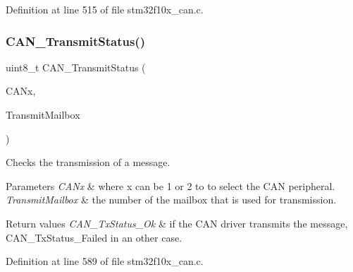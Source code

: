 Definition at line 515 of file stm32f10x\+\_\+can.\+c.

\mbox{\label{group___c_a_n___exported___functions_ga68ab05a0a6cdfcc2b6f6b6b2c10848e2}} 
\subsubsection{\texorpdfstring{C\+A\+N\+\_\+\+Transmit\+Status()}{CAN\_TransmitStatus()}}
{\footnotesize\ttfamily uint8\+\_\+t C\+A\+N\+\_\+\+Transmit\+Status (\begin{DoxyParamCaption}\item[{\hyperlink{struct_c_a_n___type_def}{C\+A\+N\+\_\+\+Type\+Def} $\ast$}]{C\+A\+Nx,  }\item[{uint8\+\_\+t}]{Transmit\+Mailbox }\end{DoxyParamCaption})}



Checks the transmission of a message. 


\begin{DoxyParams}{Parameters}
{\em C\+A\+Nx} & where x can be 1 or 2 to to select the C\+AN peripheral. \\
\hline
{\em Transmit\+Mailbox} & the number of the mailbox that is used for transmission. \\
\hline
\end{DoxyParams}

\begin{DoxyRetVals}{Return values}
{\em C\+A\+N\+\_\+\+Tx\+Status\+\_\+\+Ok} & if the C\+AN driver transmits the message, C\+A\+N\+\_\+\+Tx\+Status\+\_\+\+Failed in an other case. \\
\hline
\end{DoxyRetVals}


Definition at line 589 of file stm32f10x\+\_\+can.\+c.

\mbox{\label{group___c_a_n___exported___functions_ga94740177bab153ca5b102d122f9a8cca}} 
